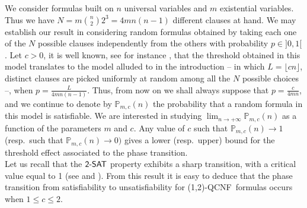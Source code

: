 \documentclass[aop,noinfoline]{imsart}
\newcommand{\onetwo}{(1,2)}
\newcommand{\twosat}{\mbox{\sf 2-SAT}}
\newcommand{\onetwoqcnf}{\mbox{\sf \onetwo-QCNF}}
\newcommand{\pmc}{\mathbb{P}_{m,c}}
\begin{document}
We consider formulas  built on $n$ universal variables and $m$ existential variables. Thus we have 
$\displaystyle N= m  {n\choose 2}  2^3= 4   m
 n(n-1)$ different clauses at hand.  
 We may  establish our result in considering random formulas obtained by taking
each one of the $N$ possible clauses
  independently from the others with probability $p\in]0,1[$. Let $c>0$, 
it is well known, see for instance  \cite[Sections 1.4 and 1.5]{JansonLR-00},  that the threshold obtained in this model translates to the
model alluded to in the introduction -- in which $ L=\lfloor cn\rfloor$, distinct clauses are picked
uniformly at random among all the $N$ possible choices --,  when $p=\frac{L}{4mn(n-1)}$.
Thus, from now on we shall always suppose that
$p=\frac{c}{4mn}$, and we continue to denote by $\pmc(n)$ the probability
that a random formula in this model is satisfiable. We are
interested in studying $\displaystyle \lim_{n\rightarrow +\infty }\pmc(n)$
as a function of the parameters $m$ and $c$. Any value of $c$ such
that $\pmc(n) \to 1$ (resp.\ such that $\pmc(n) \to 0)$ gives a
lower (resp.\ upper) bound for the threshold effect associated to
the phase transition.\\

 Let us recall that the $\twosat$ property exhibits a sharp transition, with a
critical value equal to 1 (see \cite{ChvatalR-92} and \cite{Goerdt-96}). From
this result it is easy to deduce that the phase transition from satisfiability
to unsatisfiability for  
 \onetwoqcnf\ formulas occurs
when $1\le c\le 2$. 
 
\end{document}
